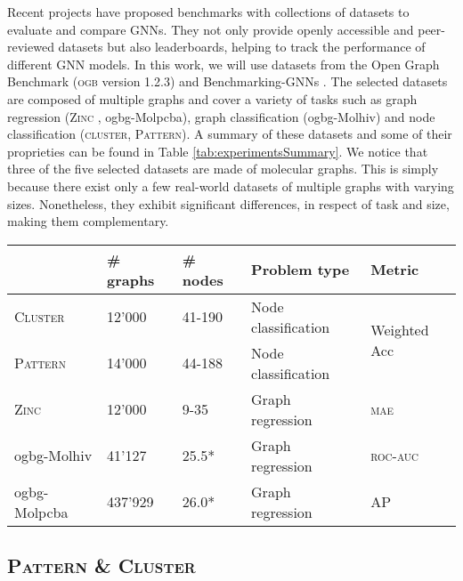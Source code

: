 \documentclass[letterpaper]{article} \usepackage{aaai21}  \usepackage{times}  \usepackage{helvet} \usepackage{courier}  \usepackage[hyphens]{url}  \usepackage{graphicx} \usepackage{natbib}  \usepackage{caption} \frenchspacing  \setlength{\pdfpagewidth}{8.5in}  \setlength{\pdfpageheight}{11in}
\begin{document}
Recent projects \cite{hu_open_2020, dwivedi_benchmarking_2020-1} have proposed benchmarks with collections of datasets to evaluate and compare GNNs. They not only provide openly accessible and peer-reviewed datasets but also leaderboards, helping to track the performance of different GNN models.
In this work, we will use datasets from the Open Graph Benchmark (\textsc{ogb} version 1.2.3) \cite{hu_open_2020} and Benchmarking-GNNs \cite{dwivedi_benchmarking_2020}.
The selected datasets are composed of multiple graphs and cover a variety of tasks such as graph regression (\textsc{Zinc} , ogbg-Molpcba), graph classification (ogbg-Molhiv) and node classification (\textsc{cluster}, \textsc{Pattern}). A summary of these datasets and some of their proprieties can be found in Table \ref{tab:experimentsSummary}.
We notice that three of the five selected datasets are made of molecular graphs. This is simply because there exist only a few real-world datasets  of multiple graphs with varying sizes. Nonetheless, they exhibit significant differences, in respect of task and size, making them complementary.


\begin{table*}[htb]
\centering
\begin{tabular}{@{}lllll@{}}
\toprule
         & \# graphs &  \# nodes  & Problem type    & Metric \\ \midrule
\textsc{Cluster}  &  12'000   & 41-190     & Node classification &  \multirow{2}{*}{Weighted Acc}      \\
\textsc{Pattern}  &  14'000   & 44-188     & Node classification &      \\
\textsc{Zinc}     & 12'000    & 9-35       & Graph regression    &  \textsc{mae}      \\
ogbg-Molhiv           &   41'127  & 25.5*      & Graph regression    & \textsc{roc-auc} \\
ogbg-Molpcba          & 437'929   & 26.0*      & Graph regression    & \textsc{AP}\\ \bottomrule
\end{tabular}
\caption{Summary of the different tasks with the number of graphs, problem type and type of metric. *is the average node number instead of the range.}
\label{tab:experimentsSummary}
\end{table*}


\subsection{\textsc{Pattern \& Cluster}}
\end{document}
